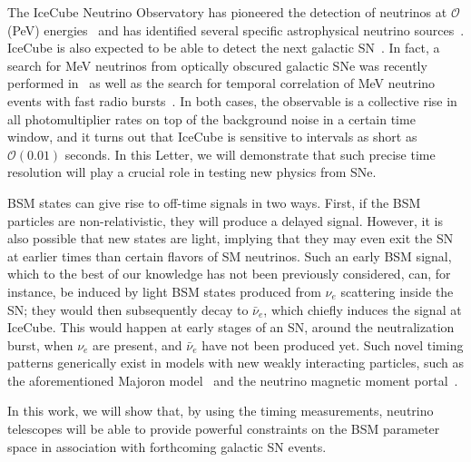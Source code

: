 \documentclass[aps,twocolumn,prl,showpacs,showkeys,preprintnumbers,superscriptaddress,nobibnotes,floatfix,longbibliography,notitlepage,nofootinbib]{revtex4-2}
\begin{document}
The IceCube Neutrino Observatory has pioneered the detection of neutrinos at $\mathcal{O}$(PeV) energies~\cite{IceCube:2014stg,IceCube:2018cha} and has identified several specific astrophysical neutrino sources~\cite{IceCube:2018cha,IceCube:2023ame,IceCube:2022der}.
IceCube is also expected to be able to detect the next galactic SN~\cite{Kopke_2011}.
In fact, a search for MeV neutrinos from optically obscured galactic SNe was recently performed in~\cite{IceCube:2023ogt} as well as the search for temporal correlation of MeV neutrino events with fast radio bursts~\cite{IceCube:2019acm}.
In both cases, the observable is a collective rise in all photomultiplier rates on top of the background noise in a certain time window, and it turns out that IceCube is sensitive to intervals as short as $\mathcal{O}(0.01)$ seconds. 
In this Letter, we will demonstrate that such precise time resolution will play a crucial role in testing new physics from SNe.   

BSM states can give rise to off-time signals in two ways.
First, if the BSM particles are non-relativistic, they will produce a delayed signal. 
However, it is also possible that new states are light, implying that they may even exit the SN at earlier times than certain flavors of SM neutrinos.
Such an early BSM signal, which to the best of our knowledge has not been previously considered, can, for instance, be induced by light BSM states produced from $\nu_e$ scattering inside the SN; they would then subsequently decay to $\bar{\nu}_e$, which chiefly induces the signal at IceCube. 
This would happen at early stages of an SN, around the neutralization burst, when $\nu_e$ are present, and $\bar{\nu}_e$ have not been produced yet.
Such novel timing patterns generically exist in models with new weakly interacting particles, such as the aforementioned Majoron model~\cite{Fiorillo:2022cdq} and the neutrino magnetic moment portal~\cite{Magill:2018jla,Brdar:2020quo}.

In this work, we will show that, by using the timing measurements, neutrino telescopes will be able to provide powerful constraints on the BSM parameter space in association with forthcoming galactic SN events.\\


\end{document}
